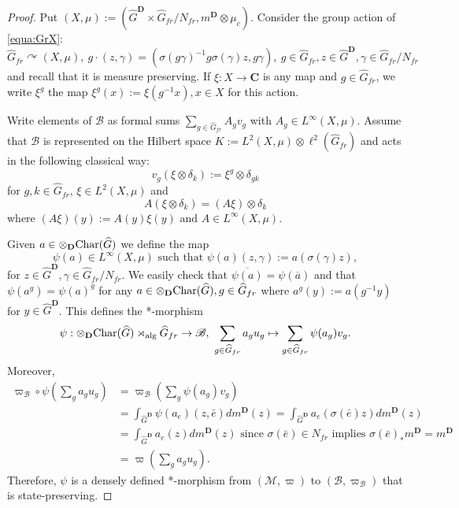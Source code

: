 \documentclass[a4paper,12pt]{amsart}
\numberwithin{equation}{section}
\theoremstyle{definition}
\newcommand{\act}{\curvearrowright}
\DeclareMathOperator{\alg}{alg}
\newcommand{\scrB}{\mathscr B}
\newcommand{\C}{\mathbf C}
\newcommand{\Ch}{\textup{Char}}
\newcommand{\D}{\mathbf D}
\newcommand{\ga}{\gamma}
\newcommand{\scrM}{\mathscr M}
\newcommand{\ot}{\otimes}\newcommand{\otmin}{\otimes_{\text{min}}}
\newcommand{\wh}{\widehat}
\begin{document}
\begin{proof}
Put $(X,\mu):=({\wh G}^\D\times \wh G_{fr}/N_{fr}, m^\D\ot \mu_c).$
Consider the group action of \eqref{equa:GrX}: 
$$\wh G_{fr}\act (X,\mu), \  g\cdot (z,\ga) = (\sigma(g\ga)^{-1} g \sigma(\ga) z, g\ga), \ g\in \wh G_{fr}, z \in {\wh G}^\D, \ga\in \wh G_{fr}/N_{fr}$$ and recall that it is measure preserving.
If $\xi:X\to \C$ is any map and $g\in \wh G_{fr}$, we write $\xi^g$ the map $\xi^g(x):=\xi(g^{-1} x), x\in X$ for this action.

Write elements of $\scrB$ as formal sums $\sum_{g\in\wh G_{fr}} A_g v_g$ with $A_g\in L^\infty(X,\mu)$.
Assume that $\scrB$ is represented on the Hilbert space $K:=L^2(X,\mu)\ot \ell^2(\wh G_{fr})$ and acts in the following classical way: 
$$v_g(\xi\ot \delta_k) := \xi^{g}\ot \delta_{gk}$$
for $g,k\in\wh G_{fr}$, $\xi \in L^2(X,\mu)$ and 
$$A (\xi\ot\delta_k) = (A\xi)\ot \delta_k$$
where $(A\xi)(y):= A(y)\xi(y) \text{ and } A\in L^\infty(X,\mu).$

Given $a\in \ot_\D \Ch(\wh G)$ we define the map 
$$\psi(a)\in L^\infty(X,\mu) \text{ such that } \psi(a)(z,\ga) := a(\sigma(\ga)z),$$
for $z\in {\wh G}^\D, \ga\in \wh G_{fr}/N_{fr}$.
We easily check that $\overline{\psi(a)} = \psi(\overline a)$ and that $\psi(a^g) = \psi(a)^g$ for any $a\in \ot_\D \Ch(\wh G), g\in \wh G_{fr}$ where $a^g(y):= a(g^{-1} y)$ for $y\in{\wh G}^\D$.
This defines the *-morphism
$$\psi  :\ot_\D \Ch(\wh G)\rtimes_{\alg} \wh G_{fr}\to \scrB, \ 
\sum_{g\in\wh G_{fr}} a_g u_g \mapsto \sum_{g\in\wh G_{fr}} \psi(a_g) v_g.$$
Moreover, 
\begin{align*}
\varpi_\scrB\circ\psi\left(\sum_g a_g u_g \right) & = \varpi_\scrB\left(\sum_g \psi(a_g) v_g \right)\\
& = \int_{{\wh G}^\D} \psi(a_e)(z,\bar e) d m^\D(z)
 = \int_{{\wh G}^\D} a_e(\sigma(\bar e)z) d m^\D(z) \\
& = \int_{{\wh G}^\D} a_e(z) d m^\D(z) \text{ since $\sigma(\bar e)\in N_{fr}$ implies $\sigma(\bar e)_*m^\D=m^\D$}\\
& = \varpi\left(\sum_g a_g u_g \right).
\end{align*}
Therefore, $\psi$ is a densely defined *-morphism from $(\scrM,\varpi)$ to $(\scrB,\varpi_\scrB)$ that is state-preserving. 


\end{proof}
\end{document}
